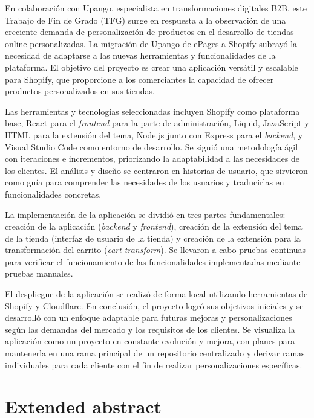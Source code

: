 \documentclass[11pt]{article}
\begin{document}
En colaboración con Upango, especialista en transformaciones digitales B2B, este Trabajo de Fin de Grado (TFG) surge en respuesta a la observación 
de una creciente demanda de personalización de productos en el desarrollo de tiendas online personalizadas. La migración de Upango de ePages 
a Shopify subrayó la necesidad de adaptarse a las nuevas herramientas y funcionalidades de la plataforma. El objetivo del proyecto es crear 
una aplicación versátil y escalable para Shopify, que proporcione a los comerciantes la capacidad de ofrecer productos personalizados en sus tiendas.

Las herramientas y tecnologías seleccionadas incluyen Shopify como plataforma base, React para el \textit{frontend} para la parte de administración, Liquid, JavaScript y HTML 
para la extensión del tema, Node.js junto con Express para el \textit{backend}, 
y Visual Studio Code como entorno de desarrollo. Se siguió una metodología ágil con iteraciones e incrementos, priorizando la adaptabilidad a las 
necesidades de los clientes. El análisis y diseño se centraron en historias de usuario, que sirvieron como guía para comprender las necesidades de los usuarios y 
traducirlas en funcionalidades concretas.

La implementación de la aplicación se dividió en tres partes fundamentales: creación de la aplicación (\textit{backend} y \textit{frontend}), creación de la extensión del tema de la tienda (interfaz de usuario de la tienda) y
creación de la extensión para la transformación del carrito (\textit{cart-transform}). 
Se llevaron a cabo pruebas continuas para verificar el funcionamiento de las funcionalidades implementadas mediante pruebas manuales.

El despliegue de la aplicación se realizó de forma local utilizando herramientas de Shopify y Cloudflare. En conclusión, el proyecto logró sus 
objetivos iniciales y se desarrolló con un enfoque adaptable para futuras mejoras y personalizaciones según las demandas del mercado y los 
requisitos de los clientes. Se visualiza la aplicación como un proyecto en constante evolución y mejora, con planes para mantenerla en una 
rama principal de un repositorio centralizado y derivar ramas individuales para cada cliente con el fin de realizar personalizaciones específicas.

\clearpage

\section{Extended abstract}
\end{document}
